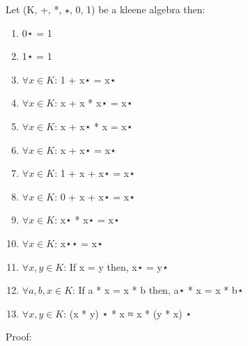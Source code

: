 Let (K, +, *, \(\star\), 0, 1) be a kleene algebra then:
\begin{enumerate}
\item 0⋆ = 1
\item 1⋆ = 1
\item \(\forall x \in K\): 1 + x⋆ = x⋆
\item \(\forall x \in K\): x + x * x⋆ = x⋆
\item \(\forall x \in K\): x + x⋆ * x = x⋆
\item \(\forall x \in K\): x + x⋆ = x⋆
\item \(\forall x \in K\): 1 + x + x⋆ = x⋆
\item \(\forall x \in K\): 0 + x + x⋆ = x⋆
\item \(\forall x \in K\): x⋆ * x⋆ = x⋆
\item \(\forall x \in K\): x⋆⋆ = x⋆
\item \(\forall x , y \in K\): If x = y then, x⋆ = y⋆
\item \(\forall a, b, x \in K\): If a * x = x * b then, a⋆ * x = x * b⋆
\item \(\forall x, y \in K\): (x * y) ⋆ * x ≈ x * (y * x) ⋆
\end{enumerate}
Proof:
